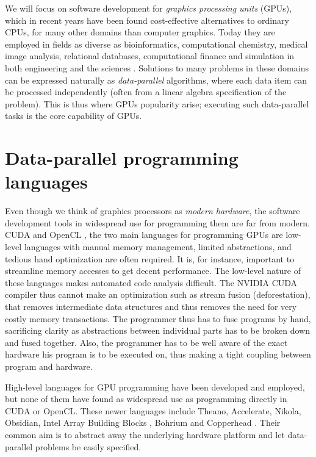 We will focus on software development for \emph{graphics processing
  units} (GPUs), which in recent years have been found cost-effective
alternatives to ordinary CPUs, for many other domains than computer
graphics. Today they are employed in fields as diverse as
bioinformatics, computational chemistry, medical image analysis,
relational databases, computational finance and simulation in both
engineering and the sciences \cite{hwy2011emerald, hwu2011jade,
  owens2007survey}. Solutions to many problems in these domains can be
expressed naturally as \emph{data-parallel} algorithms, where each
data item can be processed independently (often from a linear algebra
specification of the problem). This is thus where GPUs popularity
arise; executing such data-parallel tasks is the core capability of
GPUs.


\section{Data-parallel programming languages}
Even though we think of graphics processors as \emph{modern
  hardware}, the software development tools in widespread use for
programming them are far from modern. CUDA
\cite{nvidia2012programming} and OpenCL \cite{munshi2011opencl}, the
two main languages for programming GPUs are low-level languages with
manual memory management, limited abstractions, and tedious hand
optimization are often required. It is, for instance, important to
streamline memory accesses to get decent performance. The low-level
nature of these languages makes automated code analysis difficult. The
NVIDIA CUDA compiler thus cannot make an optimization such as stream
fusion (deforestation), that removes intermediate data structures and
thus removes the need for very costly memory transactions. The
programmer thus has to fuse programs by hand, sacrificing clarity as
abstractions between individual parts has to be broken down and fused
together. Also, the programmer has to be well aware of the exact
hardware his program is to be executed on, thus making a tight
coupling between program and hardware.

High-level languages for GPU programming have been developed and
employed, but none of them have found as widespread use as programming
directly in CUDA or OpenCL. These newer languages include
Theano\cite{bergstra2010theano},
Accelerate\cite{chakravarty2011accelerating},
Nikola\cite{mainland2010nikola}, Obsidian\cite{svensson2011obsidian},
Intel Array Building Blocks \cite{newburn2011intel}, Bohrium
\cite{homepage:bohrium} and Copperhead \cite{Catanzaro2011}. Their
common aim is to abstract away the underlying hardware platform and
let data-parallel problems be easily specified.

